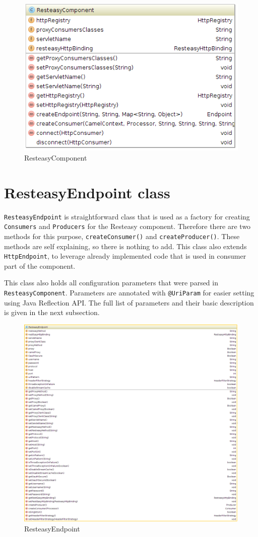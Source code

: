 \documentclass[12pt,final,oneside]{fithesis2}
\begin{document}
\begin{figure}
\centering
\includegraphics[width=0.8\linewidth]{images/component.png}
\caption{ResteasyComponent}
\label{comp}
\end{figure}

\section{ResteasyEndpoint class}
\texttt{ResteasyEndpoint}  is straightforward class that is used as a factory for creating \texttt{Consumers} and \texttt{Producers} for the Resteasy component. Therefore there are two methods for this purpose, \texttt{createConsumer()} and \texttt{createProducer()}. These methods are self explaining, so there is nothing to add. This class also extends \texttt{HttpEndpoint}, to leverage already implemented code that is used in consumer part of the component.

This class also holds all configuration parameters that were parsed in \texttt{ResteasyComponent}. Parameters are annotated with \texttt{@UriParam} for easier setting using Java Reflection API. The full list of parameters and their basic description is given in the next subsection.

\begin{figure}
\centering
\includegraphics[width=0.9\linewidth]{images/endpoint.png}
\caption{ResteasyEndpoint}
\label{endpoint}
\end{figure}
\end{document}
